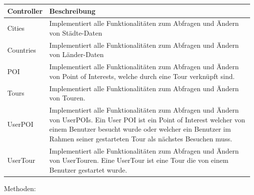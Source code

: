 \documentclass[a4paper,10pt,xetex]{article}
\begin{document}
\begin{longtabu} to \textwidth { | l | l | }
	\hline
	\textbf{Controller} & \textbf{Beschreibung} \\
	\hline
	\endhead

	 Cities &
	Implementiert alle Funktionalit\"aten zum Abfragen und \"Andern von St\"adte-Daten\\ \hline
	Countries &
	Implementiert alle Funktionalit\"aten zum Abfragen und \"Andern von L\"ander-Daten\\ \hline
    POI &
	Implementiert alle Funktionalit\"aten zum Abfragen und \"Andern von Point of Interests, welche
		durch eine Tour verkn\"upft sind.\\\hline
	Tours &
	Implementiert alle Funktionalit\"aten zum Abfragen und \"Andern von Touren.\\\hline
    UserPOI &
	Implementiert alle Funktionalit\"aten zum Abfragen und \"Andern von UserPOIs. Ein User POI ist
		ein Point of Interest welcher von einem Benutzer besucht wurde oder welcher ein Benutzer im Rahmen seiner gestarteten
		Tour als n\"achstes Besuchen muss.\\\hline
	UserTour &
	Implementiert alle Funktionalit\"aten zum Abfragen und \"Andern von UserTouren. Eine UserTour
		ist eine Tour die von einem Benutzer gestartet wurde.\\\hline
\end{longtabu}

\bigskip

Methoden:
\end{document}
